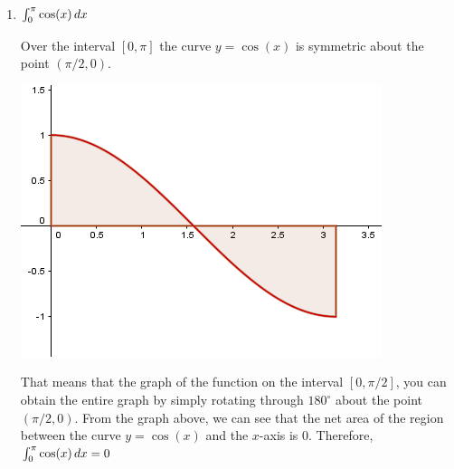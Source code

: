 \documentclass[nooutcomes]{ximera}
\begin{document}
\begin{problem}
\begin{enumerate}
      \item
     $\int_0^{\pi} \cos(x) \,d x$ 
      \begin{freeResponse}
        Over the interval $[0, \pi]$ the curve $y = \cos(x)$ is symmetric about the point $(\pi/2,0)$. 
        \begin{image}
          \includegraphics[scale = 0.6]{Images/figure4.png}
        \end{image}
        That means that the graph of the function on the interval $[0,\pi/2]$, you can obtain the entire graph by simply rotating through $180^{\circ}$ about the point $(\pi/2,0)$.  From the graph above, we can see that the net area of the region between the curve $y=\cos(x)$ and the $x$-axis is $0$.   
        Therefore, $\int_0^\pi \cos(x) \,d x =0$
      \end{freeResponse}
      
      
\end{enumerate}
\end{problem}
\end{document}
